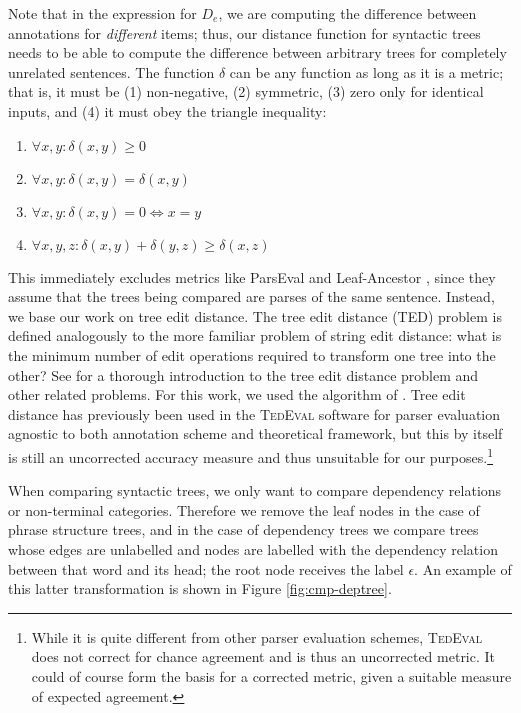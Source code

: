 \documentclass[11pt]{article}
\let\app=\textsc
\let\citeN=\newcite
\begin{document}
Note that in the expression for $D_e$, we are computing the difference between
annotations for \emph{different} items; thus, our distance function for
syntactic trees needs to be able to compute the difference between arbitrary
trees for completely unrelated sentences. The function $\delta$ can be any
function as long as it is a metric; that is, it must be (1) non-negative, (2)
symmetric, (3) zero only for identical inputs, and (4) it must obey the
triangle inequality:
\begin{enumerate}
    \item $\forall x,y: \delta(x, y) \geq 0$
    \item $\forall x,y: \delta(x, y) = \delta(x, y)$
    \item $\forall x,y: \delta(x, y) = 0 \Leftrightarrow x = y$
    \item $\forall x,y,z: \delta(x, y) + \delta(y, z) \geq \delta(x, z)$
\end{enumerate}

This immediately excludes metrics like ParsEval \cite{Black:etal91} and
Leaf-Ancestor \cite{Sam:Bab03}, since they assume that the trees being
compared are parses of the same sentence. Instead, we base our work on tree
edit distance. The tree edit distance (TED) problem is defined analogously to
the more familiar problem of string edit distance: what is the minimum number
of edit operations required to transform one tree into the other? See
\citeN{Bille05} for a thorough introduction to the tree edit distance problem
and other related problems. For this work, we used the algorithm of
\citeN{Zha:Sha89}. Tree edit distance has previously been used in the
\app{TedEval} software \cite{Tsa:Niv:And11,Tsa:Niv:And12} for parser
evaluation agnostic to both annotation scheme and theoretical framework, but
this by itself is still an uncorrected accuracy measure and thus unsuitable
for our purposes.\footnote{While it is quite different from other parser
evaluation schemes, \app{TedEval} does not correct for chance agreement and is
thus an uncorrected metric. It could of course form the basis for a corrected
metric, given a suitable measure of expected agreement.}

When comparing syntactic trees, we only want to compare dependency relations
or non-terminal categories. Therefore we remove the leaf nodes in the case of
phrase structure trees, and in the case of dependency trees we compare trees
whose edges are unlabelled and nodes are labelled with the dependency relation
between that word and its head; the root node receives the label $\epsilon$.
An example of this latter transformation is shown in Figure
\ref{fig:cmp-deptree}.
\end{document}
